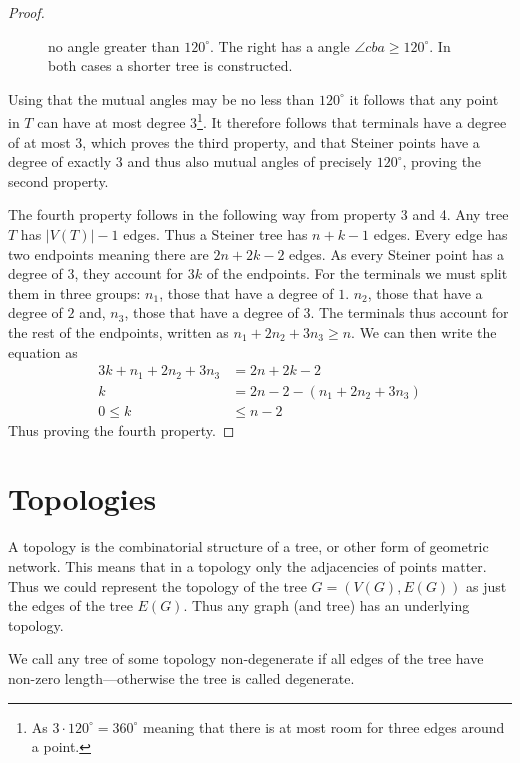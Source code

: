 \begin{proof}
{\begin{figure}[htbp]
{  no angle greater than $120^{\circ}$. The right has a angle
  $\angle cba \ge 120^{\circ}$. In both cases a shorter tree is
  constructed\footnotemark.\label{fig:preliminaries-steiner-point}}
\end{figure}
}
%
Using that the mutual angles may be no less than $120^{\circ}$ it follows that
any point in $T$ can have at most degree $3$\footnote{As
$3 \cdot 120^{\circ} = 360^{\circ}$ meaning that there is at most room for three
edges around a point.}. It therefore follows that terminals have a degree of at
most $3$, which proves the third property, and that Steiner points have a
degree of exactly $3$ and thus also mutual angles of precisely $120^{\circ}$,
proving the second property.

The fourth property follows in the following way from property 3 and 4. Any
tree $T$ has $|V(T)|-1$ edges. Thus a Steiner tree has $n+k-1$ edges.
Every edge has two endpoints meaning there are $2 n + 2 k - 2$ edges. As every
Steiner point has a degree of $3$, they account for $3 k$ of the endpoints. For
the terminals we must split them in three groups: $n_1$, those that have a
degree of $1$. $n_2$, those that have a degree of $2$ and, $n_3$, those that
have a degree of $3$. The terminals thus account for the rest of the
endpoints, written as $n_1 + 2 n_2 + 3 n_3 \ge n$. We can then write the
equation as
%
\begin{align}
  \label{eq:22}
  3 k + n_1 + 2 n_2 + 3 n_3 &= 2 n + 2 k - 2 \\
  k &= 2 n - 2 - (n_1 + 2 n_2 + 3 n_3) \\
  0 \le k &\le n - 2
\end{align}
%
Thus proving the fourth property.
\end{proof}

\section{Topologies}
\label{sec:topologies-1}

A topology is the combinatorial structure of a tree, or other form of geometric
network. This means that in a topology only the adjacencies of points
matter. Thus we could represent the topology of the tree $G = (V(G), E(G))$ as
just the edges of the tree $E(G)$. Thus any graph (and tree) has an
underlying topology.

We call any tree of some topology non-degenerate if all edges of the tree have
non-zero length---otherwise the tree is called degenerate.

